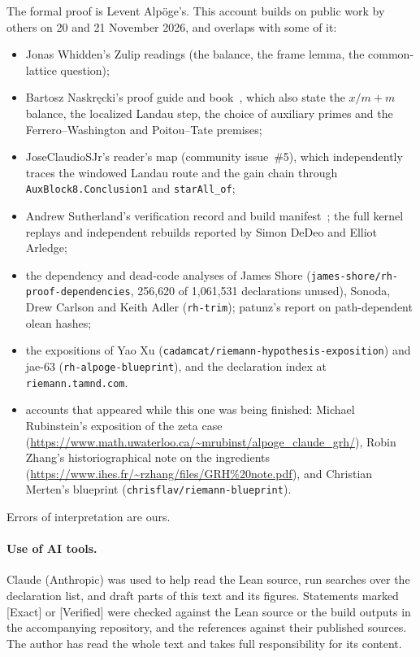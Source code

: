\documentclass[11pt]{article}
\newcommand{\Exact}{\textcolor{exactc}{\textsf{\small[Exact]}}}
\newcommand{\Verified}{\textcolor{verc}{\textsf{\small[Verified]}}}
\theoremstyle{plain}
\theoremstyle{definition}
\begin{document}
The formal proof is Levent Alp\"oge's. This account builds on public work by others on 20 and 21
November 2026, and overlaps with some of it:
\begin{itemize}
\item Jonas Whidden's Zulip readings (the balance, the frame lemma, the common-lattice question);
\item Bartosz Naskr\k{e}cki's proof guide and book~\cite{naskrecki}, which also state the
  $x/m+m$ balance, the localized Landau step, the choice of auxiliary primes and the
  Ferrero--Washington and Poitou--Tate premises;
\item JoseClaudioSJr's reader's map (community issue~\#5), which independently traces the windowed
  Landau route and the gain chain through \texttt{AuxBlock8.Conclusion1} and \texttt{starAll\_of};
\item Andrew Sutherland's verification record and build manifest~\cite{sutherland}; the full kernel replays and
  independent rebuilds reported by Simon DeDeo and Elliot Arledge;
\item the dependency and dead-code analyses of James Shore (\texttt{james-shore/rh-proof-dependencies},
  256{,}620 of 1{,}061{,}531 declarations unused), Sonoda, Drew Carlson and Keith Adler
  (\texttt{rh-trim}); patunz's report on path-dependent olean hashes;
\item the expositions of Yao Xu (\texttt{cadamcat/riemann-hypothesis-exposition}) and jae-63
  (\texttt{rh-alpoge-blueprint}), and the declaration index at \texttt{riemann.tamnd.com}.
\item accounts that appeared while this one was being finished: Michael Rubinstein's exposition of
  the zeta case (\url{https://www.math.uwaterloo.ca/~mrubinst/alpoge_claude_grh/}), Robin Zhang's
  historiographical note on the ingredients (\url{https://www.ihes.fr/~rzhang/files/GRH%20note.pdf}),
  and Christian Merten's blueprint (\texttt{chrisflav/riemann-blueprint}).
\end{itemize}
Errors of interpretation are ours.

\paragraph{Use of AI tools.} Claude (Anthropic) was used to help read the Lean source, run
searches over the declaration list, and draft parts of this text and its figures. Statements marked
\Exact{} or \Verified{} were checked against the Lean source or the build outputs in the
accompanying repository, and the references against their published sources. The author has read
the whole text and takes full responsibility for its content.
\end{document}
